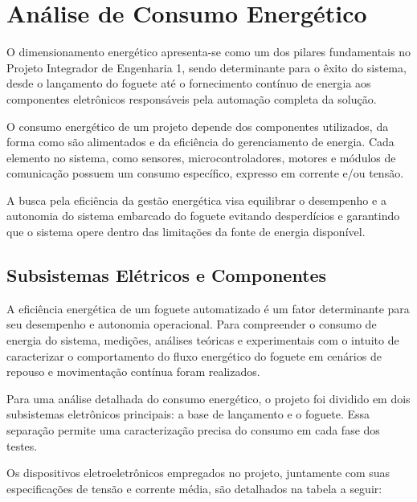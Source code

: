 \section{Análise de Consumo Energético}

O dimensionamento energético apresenta-se como um dos pilares fundamentais no Projeto Integrador de Engenharia 1, sendo determinante para o êxito do sistema, desde o lançamento do foguete até o fornecimento contínuo de energia aos componentes eletrônicos responsáveis pela automação completa da solução. 

O consumo energético de um projeto depende dos componentes utilizados, da forma como são alimentados e da eficiência do gerenciamento de energia. Cada elemento no sistema, como sensores, microcontroladores, motores e módulos de comunicação possuem um consumo específico, expresso em corrente e/ou tensão. 

A busca pela eficiência da gestão energética visa equilibrar o desempenho e a autonomia do sistema embarcado do foguete evitando desperdícios e garantindo que o sistema opere dentro das limitações da fonte de energia disponível. 

\subsection{Subsistemas Elétricos e Componentes}

A eficiência energética de um foguete automatizado é um fator determinante para seu desempenho e autonomia operacional. Para compreender o consumo de energia do sistema, medições, análises teóricas e experimentais com o intuito de caracterizar o comportamento do fluxo energético do foguete em cenários de repouso e movimentação contínua foram realizados.  

Para uma análise detalhada do consumo energético, o projeto foi dividido em dois subsistemas eletrônicos principais: a base de lançamento e o foguete. Essa separação permite uma caracterização precisa do consumo em cada fase dos testes.

Os dispositivos eletroeletrônicos empregados no projeto, juntamente com suas especificações de tensão e corrente média, são detalhados na tabela a seguir: 

